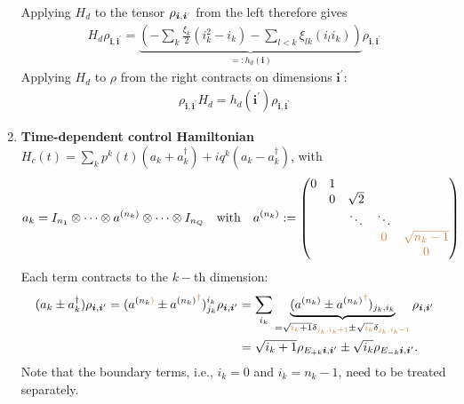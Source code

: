 \documentclass[letterpaper]{article}
\newcommand{\bfi}{\boldsymbol{i}}
\newcommand{\p}{\prime}
\newcommand{\YC}[1]{{\textcolor{Bronze}{#1}}}
\begin{document}
\begin{enumerate}
      Applying $H_d$ to the tensor $\rho_{\bfi, \bfi^\YC{\p}}$ from the left
      therefore gives  
      \begin{align}
        H_d \rho_{\bfi, \bfi^\p} = \underbrace{\left(-\sum_k
        \frac{\xi_k}{2}(i_k^2 - i_k) - \sum_{l<k} \xi_{lk} (i_l i_k)
        \right)}_{=:h_d(\bfi)} \rho_{\bfi, \bfi^\p}
      \end{align}
      Applying $H_d$ to $\rho$ from the right contracts on dimensions
      $\bfi^\prime$:
      \begin{align}
        \rho_{\bfi, \bfi^\p} H_d  = h_d(\bfi^\p) \rho_{\bfi,\bfi^\p}
      \end{align}

    \item \textbf{Time-dependent control Hamiltonian} $H_c(t) = \sum_k p^k(t)
      (a_k + a_k^\dag) + iq^k(a_k - a_k^\dag)$, with  
      \begin{align}
      a_k = I_{n_1}\otimes \dots \otimes a^{(n_k)} \otimes \dots \otimes I_{n_Q}
        \quad \text{with} \quad a^{(n_k)} := \begin{pmatrix} 0 & 1 & \\ & 0 &
        \sqrt{2} & \\ & & \ddots & \ddots \\ & & & \YC{0} &
        \YC{\sqrt{n_k-1}} \\ & & & & \YC{0} \end{pmatrix}
      \end{align}
      Each term contracts to the $k-$th dimension:
      \begin{align}
        (a_k\pm a_k^\dag) \rho_{\bfi,\bfi^\p} = (a^{(n_k\YC{)}} \pm
        {a^{(n_k)}}^\YC{\dag})^{i_k}_{j_k} \rho_{\bfi,\bfi^\prime} &= \sum_{i_k}
        \underbrace{(a^{(n_k)} \pm {a^{(n_k)}}^{\YC{\dag}})_{j_k,i_k}}_{=
        \sqrt{\YC{i_k}+1}
        \delta_{\YC{j_k,i_k+1}} \pm \sqrt{\YC{i_k}} \delta_{\YC{j_k,i_k-1}}}
        \rho_{\bfi, \bfi^{\prime}} \\
        &= \sqrt{i_k+1} \rho_{E_{+k}\bfi, \bfi^\prime} \pm \sqrt{i_k}
        \rho_{E_{-k}\bfi, \bfi^\prime}.
      \end{align}
      \YC{Note that the boundary terms, i.e., $i_k = 0$ and $i_k = n_k-1$, need
      to be treated separately.}


\end{enumerate}
\end{document}
